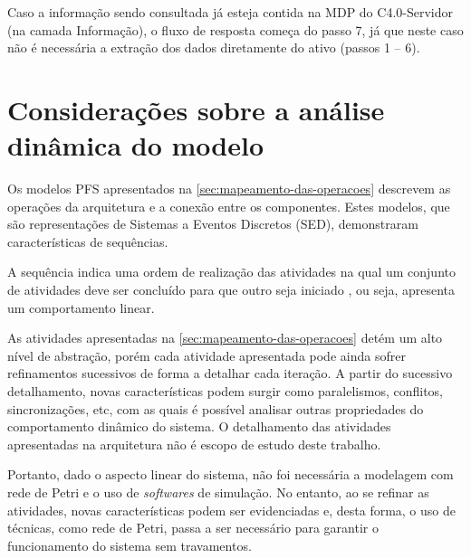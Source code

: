 Caso a informação sendo consultada já esteja contida na MDP do C4.0-Servidor (na camada Informação), o fluxo de resposta começa do passo 7, já que neste caso não é necessária a extração dos dados diretamente do ativo (passos 1 -- 6).

\section{Considerações sobre a análise dinâmica do modelo}
\label{sec:analise-dinamica}

Os modelos PFS apresentados na \autoref{sec:mapeamento-das-operacoes} descrevem as operações da arquitetura e a conexão entre os componentes. Estes modelos, que são representações de Sistemas a Eventos Discretos (SED), demonstraram características de sequências.

A sequência indica uma ordem de realização das atividades na qual um conjunto de atividades deve ser concluído para que outro seja iniciado  \cite{fattori2012petri}, ou seja, apresenta um comportamento linear.

As atividades apresentadas na \autoref{sec:mapeamento-das-operacoes} detém um alto nível de abstração, porém cada atividade apresentada pode ainda sofrer refinamentos sucessivos de forma a detalhar cada iteração. A partir do sucessivo detalhamento, novas características podem surgir como paralelismos, conflitos, sincronizações, etc, com as quais é possível analisar outras propriedades do comportamento dinâmico do sistema. O detalhamento das atividades apresentadas na arquitetura não é escopo de estudo deste trabalho.

Portanto, dado o aspecto linear do sistema, não foi necessária a modelagem com rede de Petri e o uso de \textit{softwares} de simulação. No entanto, ao se refinar as atividades, novas características podem ser evidenciadas e, desta forma, o uso de técnicas, como rede de Petri, passa a ser necessário para garantir o funcionamento do sistema sem travamentos.
